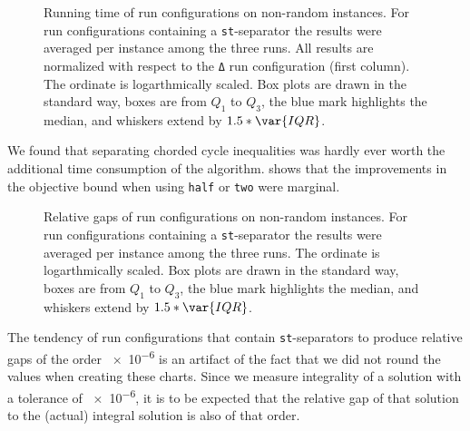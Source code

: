 \begin{figure}[H]
	\centering
	\resizebox{0.95\linewidth}{!}{
	}
	\bigskip
	\caption[Running time on non-random data]{Running time of run configurations on non-random instances.
		For run configurations containing a \texttt{st}-separator the results were averaged per instance among the three runs.
		All results are normalized with respect to the \texttt{Δ} run configuration (first column).
		The ordinate is logarthmically scaled.
		Box plots are drawn in the standard way, \ie boxes are from $Q_{1}$ to $Q_{3}$, the blue mark highlights the median, and whiskers extend by $1.5*\var{IQR}$.}
	\label{fig:non_random_time_bars}
\end{figure}

We found that separating chorded cycle inequalities was hardly ever worth the additional time consumption of the algorithm.
 shows that the improvements in the objective bound when using \texttt{half} or \texttt{two} were marginal.

\begin{figure}[H]
	\centering
	\resizebox{0.95\linewidth}{!}{
	}
	\bigskip
	\caption[Relative gaps on non-random data]{Relative gaps of run configurations on non-random instances.
		For run configurations containing a \texttt{st}-separator the results were averaged per instance among the three runs.
		The ordinate is logarthmically scaled.
		Box plots are drawn in the standard way, \ie boxes are from $Q_{1}$ to $Q_{3}$, the blue mark highlights the median, and whiskers extend by $1.5*\var{IQR}$.}
	\label{fig:non_random_log_gap_bars}
\end{figure}

The tendency of run configurations that contain \texttt{st}-separators to produce relative gaps of the order \num{e-6} is an artifact of the fact that we did not round the values when creating these charts.
Since we measure integrality of a solution with a tolerance of \num{e-6}, it is to be expected that the relative gap of that solution to the (actual) integral solution is also of that order.

